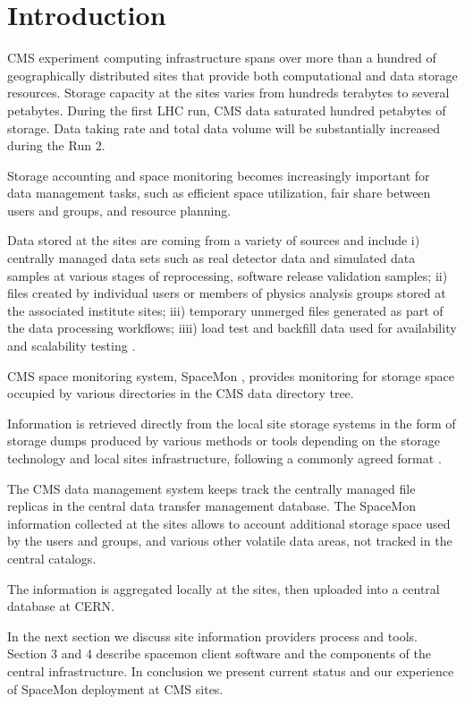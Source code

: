 \section{Introduction}

CMS experiment computing \cite{cmscomptdr} infrastructure spans over more than a hundred 
of geographically distributed sites that provide both computational and data storage 
resources. Storage capacity at the sites varies from hundreds terabytes to several petabytes. 
During the first LHC run, CMS data saturated hundred petabytes of storage. 
Data taking rate and total data volume will be substantially increased during the Run 2.


Storage accounting and space monitoring becomes increasingly important for data 
management tasks, such as efficient space utilization, fair share between users and 
groups, and resource planning. 

Data stored at the sites are coming from a variety of sources and include i) centrally managed 
data sets such as real detector data and simulated data samples at various stages of reprocessing, 
software release validation samples; ii) files created by individual 
users or members of physics analysis groups stored at the associated institute sites; 
iii) temporary unmerged files generated as part of the data processing workflows; 
iiii) load test and backfill data used for availability and scalability testing \cite{scalability}.

CMS space monitoring system, SpaceMon \cite{spacemon}, provides monitoring for storage space 
occupied by various directories in the CMS data directory tree. 

Information is retrieved directly from the local site storage systems in the form of 
storage dumps produced by various methods or tools depending on the storage technology and
local sites infrastructure, following a commonly agreed format \cite{LHCstorageaccouting}.

The CMS data management system \cite{cmsdatamanagement} keeps track the centrally managed 
file replicas in the central data transfer management database. The SpaceMon information 
collected at the sites allows to account additional storage space used by the users 
and groups, and various other volatile data areas, not tracked in the central catalogs.

The information is aggregated locally at the sites, then uploaded into a central database at CERN.

In the next section we discuss site information providers process and tools.
Section 3 and 4 describe spacemon client software and the components of the central infrastructure.
In conclusion we present current status and our experience of SpaceMon deployment at CMS sites.
